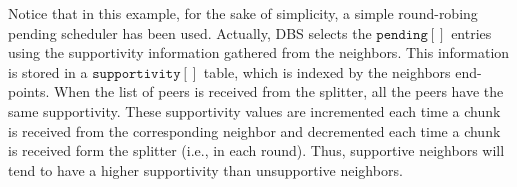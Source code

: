Notice that in this example, for the sake of simplicity, a simple
round-robing pending scheduler has been used.  Actually, DBS selects
the $\mathtt{pending}[]$ entries using the supportivity information
gathered from the neighbors. This information is stored in a
$\mathtt{supportivity}[]$ table, which is indexed by the neighbors
end-points. When the list of peers is received from the splitter, all
the peers have the same supportivity. These supportivity values are
incremented each time a chunk is received from the corresponding
neighbor and decremented each time a chunk is received form the
splitter (i.e., in each round). Thus, supportive neighbors will tend
to have a higher supportivity than unsupportive neighbors.






\begin{comment}
In each round, peers check if a chunk have been received from the rest
of peers of the team (${\cal P}_k\in {\cal T}_j)$). If not, peers send
a $[\mathtt{propagate}~{\cal P}_i]$ to one or more (possibly
to the rest of) peers of the team, where ${\cal P}_i$ is the origin peer
of the missing chunk. At this point, the process continues as
described in Section~\ref{dbs:chunk_flooding}.
\end{comment}

